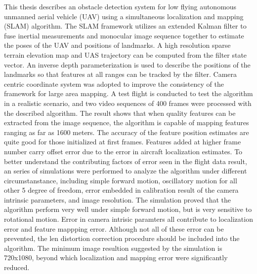 This thesis describes an obstacle detection system for low flying
autonomous unmanned aerial vehicle (UAV) using a simultaneous localization and
mapping (SLAM) algorithm.
The SLAM framework utilizes an extended Kalman filter to fuse inertial
measurements and monocular image sequence together to estimate the
poses of the UAV and positions of landmarks. A high resolution sparse terrain elevation map
and UAS trajectory can be computed from the filter state vector.
An inverse depth parameterization is used to describe the positions of
the landmarks so that features at all ranges can be tracked by the
filter. Camera centric coordinate system was adopted to improve the
consistency of the framework for large area mapping. A test flight is
conducted to test the algorithm in a realistic scenario, and two video
sequences of 400 frames were processed with the described algorithm.
The result shows that when quality features can be extracted from the
image sequence, the algorithm is capable of mapping features ranging
as far as 1600 meters. The accuracy of the feature position estimates
are quite good for those initialized at first frames. Features added
at higher frame number carry offset error due to the error in aircraft
localization estimates. To better understand the contributing factors
of error seen in the flight data result, an series of simulations were
performed to analyze the algorithm under different circumstanstance,
including simple forward motion, oscillatory motion for all
other 5 degree of freedom, error embedded in calibration result of the
camera intrinsic parameters, and image resolution. The simulation
proved that the algorithm perform very well under simple forward
motion, but is very sensitive to rotational motion. Error in camera
intrisic paramters all contribute to localization error and feature
mappping error. Although not all of these error can be prevented, the
len distortion correction procedure should be included into the
algorithm.  The minimum image resultion suggested by the
simulation is 720x1080, beyond which localization and mapping error
were significantly reduced. 
